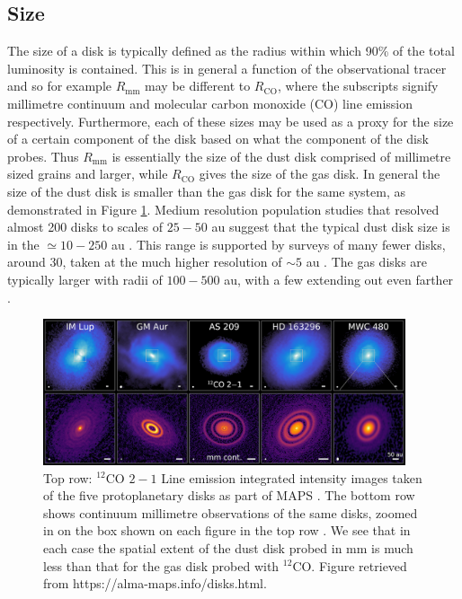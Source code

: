 \subsection{Size}

The size of a disk is typically defined as the radius within which 90\% of the total luminosity is contained.
This is in general a function of the observational tracer and so for example $R_\mathrm{mm}$ may be different to $R_\mathrm{CO}$, where the subscripts signify millimetre continuum and molecular carbon monoxide (CO) line emission respectively. 
Furthermore, each of these sizes may be used as a proxy for the size of a certain component of the disk based on what the component of the disk probes.
Thus $R_\mathrm{mm}$ is essentially the size of the dust disk comprised of millimetre sized grains and larger, while $R_\mathrm{CO}$ gives the size of the gas disk.
In general the size of the dust disk is smaller than the gas disk for the same system, as demonstrated in Figure \ref{fig:maps_disks}.
Medium resolution population studies that resolved almost 200 disks to scales of $25-50$ au suggest that the typical dust disk size is in the $\simeq 10 - 250$ au \citep{tripathi2017,andrews2018a,hendler2020}.
This range is supported by surveys of many fewer disks, around 30, taken at the much higher resolution of $\sim5$ au \citep{long2018,huang2018b}.
The gas disks are typically larger with radii of $100 - 500$ au, with a few extending out even farther \citep{ansdell2018,zhang2021}.

\begin{figure}
    \centering
    \includegraphics[width = 0.95\textwidth]{figures/Figure-DISKS-Website.png}
    \caption{Top row: $^{12}$CO $2-1$ Line emission integrated intensity images taken of the five protoplanetary disks as part of MAPS \citep{oberg2021}.
    The bottom row shows continuum millimetre observations of the same disks, zoomed in on the box shown on each figure in the top row \citep{andrews2018,huang2020,oberg2021}. 
    We see that in each case the spatial extent of the dust disk probed in mm is much less than that for the gas disk probed with $^{12}$CO.
    Figure retrieved from https://alma-maps.info/disks.html.}
    \label{fig:maps_disks}
\end{figure}

